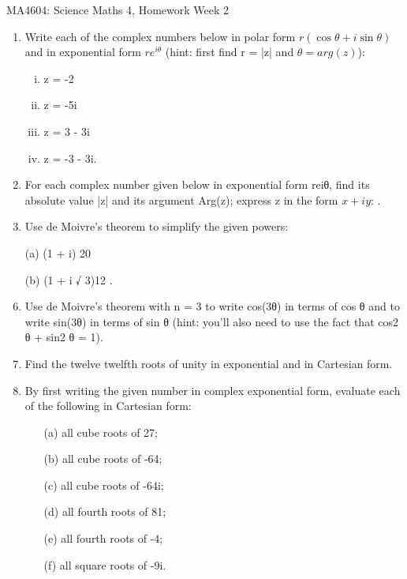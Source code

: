 \documentclass[12pt, a4paper]{report}
\theoremstyle{plain}
\theoremstyle{definition}
\theoremstyle{remark}
\begin{document}
\newpage
MA4604: Science Maths 4, Homework Week 2
\begin{enumerate}
\item Write each of the complex numbers below in polar form $r(\cos \theta +  i \sin \theta)$ and in exponential form $re^{i\theta}$
(hint: first find r = |z| and $\theta = arg(z)$):
\begin{multicols}{2}
\begin{enumerate}[(i)]
	\item z = -2 \item z = -5i \item z = 3 - 3i \item z = -3 - 3i.
\end{enumerate}
\end{multicols}

\item For each complex number given below in exponential form reiθ, find its absolute value |z|
and its argument Arg(z); express z in the form $x + iy$:
.
\item Use de Moivre’s theorem to simplify the given powers: \item[(a)] (1 + i)
20 \item[(b)] (1 + i
√
3)12
.
\item Use de Moivre’s theorem with n = 3 to write cos(3θ) in terms of cos θ and to write sin(3θ)
in terms of sin θ (hint: you’ll also need to use the fact that cos2
θ + sin2
θ = 1).
\item Find the twelve twelfth roots of unity in exponential and in Cartesian form.
\item By first writing the given number in complex exponential form, evaluate each of the
following in Cartesian form:

\begin{multicols}{2}
\begin{enumerate}[(i)]
\item[(a)] all cube roots of 27; \item[(b)] all cube roots of -64;
\item[(c)] all cube roots of -64i; \item[(d)] all fourth roots of 81; \item[(e)] all fourth roots of -4;
\item[(f)] all square roots of -9i.
\end{enumerate}
\end{multicols}

\end{enumerate}
\end{document}
